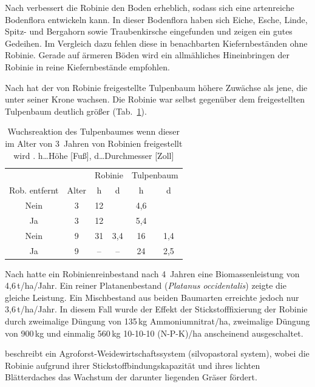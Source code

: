 \documentclass[twocolumn]{scrartcl}
\begin{document}
Nach \citet[S.~90--92]{erteld1952robinieErtrag} verbessert die Robinie
den Boden erheblich, sodass sich eine artenreiche Bodenflora
entwickeln kann. In dieser Bodenflora haben sich Eiche, Esche, Linde,
Spitz- und Bergahorn sowie Traubenkirsche eingefunden und zeigen ein
gutes Gedeihen. Im Vergleich dazu fehlen diese in benachbarten
Kiefernbeständen ohne Robinie. Gerade auf ärmeren Böden wird ein
allmähliches Hineinbringen der Robinie in reine Kiefernbestände
empfohlen.

Nach \citet{beck1974robinieTulpenbaum} hat der von Robinie
freigestellte Tulpenbaum höhere Zuwächse als jene, die unter seiner
Krone wachsen. Die Robinie war selbst gegenüber dem freigestellten
Tulpenbaum deutlich größer (Tab.~\ref{tab:tulpenbaumRobinie}).

\begin{table}[htbp]
\centering
\begin{tabular}{cccc|cc}
 &  & \multicolumn{2}{c}{Robinie} & \multicolumn{2}{c}{Tulpenbaum} \\
  Rob. entfernt &  Alter & h   & d &  h & d \\
  \hline
Nein         &      3 & 12 &   & 4,6 & \\
Ja           &      3 & 12 &   & 5,4 & \\
Nein         &      9 & 31 & 3,4 & 16 & 1,4 \\
Ja           &      9 & -- & --  & 24 & 2,5 \\
\end{tabular}
\caption{Wuchsreaktion des Tulpenbaumes wenn dieser im Alter von 3~Jahren von Robinien freigestellt wird \citep{beck1974robinieTulpenbaum}.
  h\dots Höhe [Fuß], d\dots Durchmesser [Zoll]}
  \label{tab:tulpenbaumRobinie}
\end{table}

Nach \citet{dickmann1985robinieMischbestand} hatte ein
Robinienreinbestand nach 4~Jahren eine Biomassenleistung von
4,6\,t/ha/Jahr. Ein reiner Platanenbestand (\emph{Platanus
occidentalis}) zeigte die gleiche Leistung. Ein Mischbestand aus
beiden Baumarten erreichte jedoch nur 3,6\,t/ha/Jahr. In diesem Fall
wurde der Effekt der Stickstofffixierung der Robinie durch zweimalige
Düngung von 135\,kg Ammoniumnitrat/ha, zweimalige Düngung von 900\,kg
und einmalig 560\,kg 10-10-10 (N-P-K)/ha anscheinend ausgeschaltet.

\citet[p.~467, 586]{ashton2018silviculture} beschreibt ein
Agroforst-Weidewirtschaftssystem (silvopastoral system), wobei die
Robinie aufgrund ihrer Stickstoffbindungskapazität und ihres lichten
Blätterdaches das Wachstum der darunter liegenden Gräser fördert.
\end{document}
